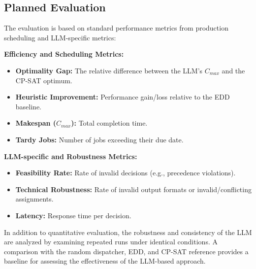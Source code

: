\documentclass{article}
\begin{document}
\subsection{Planned Evaluation}
The evaluation is based on standard performance metrics from production scheduling and LLM-specific metrics:

\textbf{Efficiency and Scheduling Metrics:}
\begin{itemize}
    \item \textbf{Optimality Gap:} The relative difference between the LLM's $C_{max}$ and the CP-SAT optimum.
    \item \textbf{Heuristic Improvement:} Performance gain/loss relative to the EDD baseline.
    \item \textbf{Makespan ($C_{max}$):} Total completion time.
    \item \textbf{Tardy Jobs:} Number of jobs exceeding their due date.
\end{itemize}

\textbf{LLM-specific and Robustness Metrics:}
\begin{itemize}
    \item \textbf{Feasibility Rate:} Rate of invalid decisions (e.g., precedence violations).
    \item \textbf{Technical Robustness:} Rate of invalid output formats or invalid/conflicting assignments.
    \item \textbf{Latency:} Response time per decision.
\end{itemize}

In addition to quantitative evaluation, the robustness and consistency of the
LLM are analyzed by examining repeated runs under identical conditions.
A comparison with the random dispatcher, EDD, and CP-SAT reference provides
a baseline for assessing the effectiveness of the LLM-based approach.

\printbibliography
\end{document}
